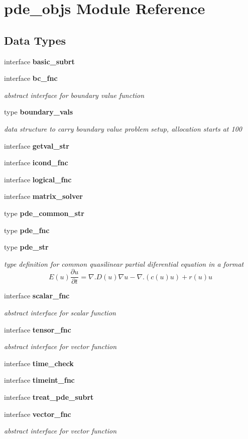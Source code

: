 \section{pde\+\_\+objs Module Reference}
\label{namespacepde__objs}
\subsection*{Data Types}
\begin{DoxyCompactItemize}
\item 
interface {\bf basic\+\_\+subrt}
\item 
interface {\bf bc\+\_\+fnc}
\begin{DoxyCompactList}\small\item\em abstract interface for boundary value function \end{DoxyCompactList}\item 
type {\bf boundary\+\_\+vals}
\begin{DoxyCompactList}\small\item\em data structure to carry boundary value problem setup, allocation starts at 100 \end{DoxyCompactList}\item 
interface {\bf getval\+\_\+str}
\item 
interface {\bf icond\+\_\+fnc}
\item 
interface {\bf logical\+\_\+fnc}
\item 
interface {\bf matrix\+\_\+solver}
\item 
type {\bf pde\+\_\+common\+\_\+str}
\item 
type {\bf pde\+\_\+fnc}
\item 
type {\bf pde\+\_\+str}
\begin{DoxyCompactList}\small\item\em type definition for common quasilinear partial diferential equation in a format \[ E(u)\frac{\partial u}{\partial t} = \nabla . D(u) \nabla u - \nabla . (c(u) u) + r(u) u \] \end{DoxyCompactList}\item 
interface {\bf scalar\+\_\+fnc}
\begin{DoxyCompactList}\small\item\em abstract interface for scalar function \end{DoxyCompactList}\item 
interface {\bf tensor\+\_\+fnc}
\begin{DoxyCompactList}\small\item\em abstract interface for vector function \end{DoxyCompactList}\item 
interface {\bf time\+\_\+check}
\item 
interface {\bf timeint\+\_\+fnc}
\item 
interface {\bf treat\+\_\+pde\+\_\+subrt}
\item 
interface {\bf vector\+\_\+fnc}
\begin{DoxyCompactList}\small\item\em abstract interface for vector function \end{DoxyCompactList}\end{DoxyCompactItemize}
